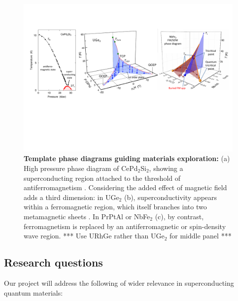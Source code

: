 \begin{figure}
  \includegraphics[width=1.9\columnwidth]{Figures/PhaseDias.pdf}
  \caption{{\bf Template phase diagrams guiding materials exploration:}  (a) High pressure phase diagram of CePd$_2$Si$_2$, showing a superconducting region attached to the 
  threshold of antiferromagnetism \protect{}. Considering the added effect of magnetic field adds a third dimension:
  in UGe$_2$ (b), 
  superconductivity appears within a ferromagnetic region, which itself branches into two metamagnetic sheets \protect\cite{kotegawa11}. In PrPtAl or NbFe$_2$ \protect{} (c), by contrast, ferromagnetism is replaced by an antiferromagnetic or spin-density wave region. *** Use URhGe rather than UGe$_2$ for middle panel ***
}
  \label{fig:Guiding}
  
\end{figure}
  
   
\subsection*{Research questions}
\noindent
Our project will address the following  of wider relevance in superconducting quantum materials:

